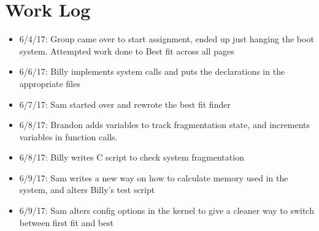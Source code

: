 \documentclass{article}
\begin{document}
\section{Work Log}
    \begin{itemize}
        \item 6/4/17: Group came over to start assignment, ended up just hanging the boot system. Attempted work done to Best fit across all pages
        \item 6/6/17: Billy implements system calls and puts the declarations in the appropriate files
        \item 6/7/17: Sam started over and rewrote the best fit finder
        \item 6/8/17: Brandon adds variables to track fragmentation state, and increments variables in function calls.
        \item 6/8/17: Billy writes C script to check system fragmentation
        \item 6/9/17: Sam writes a new way on how to calculate memory used in the system, and alters Billy's test script
        \item 6/9/17: Sam alters config options in the kernel to give a cleaner way to switch between first fit and best
    \end{itemize}
\end{document}
